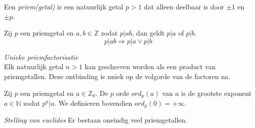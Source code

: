 \documentclass[main.tex]{subfiles}
\begin{document}
\begin{de}
  Een \emph{priem(getal)} is een natuurlijk getal $p > 1$ dat alleen deelbaar is door $\pm 1$ en $\pm p$.
\end{de}

\begin{st}
  Zij $p$ een priemgetal en $a,b \in \mathbb{Z}$ zodat $p|ab$, dan geldt $p|a$ of $p|b$.
  \[ p|ab \Rightarrow p|a \vee p|b \]

\end{st}

\begin{st}
  \emph{Unieke priemfactorisatie}\\
  Elk natuurlijk getal $n > 1$ kan geschreven worden als een product van priemgetallen.
  Deze ontbinding is uniek op de volgorde van de factoren na.

\end{st}

\begin{de}
  Zij $p$ een priemgetal en $a \in \mathbb{Z}_{0}$. De $p$ orde $ord_{p}(a)$ van $a$ is de grootste exponent $a\in \mathbb{N}$ zodat $p^{a}|a$. We definieren bovendien $ord_{p}(0) = +\infty$.
\end{de}

\begin{st}
  \emph{Stelling van euclides}
  Er bestaan oneindig veel priemgetallen.

\end{st}
\end{document}
